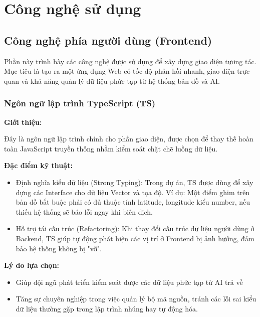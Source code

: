 \chapter{Công nghệ sử dụng}

\section{Công nghệ phía người dùng (Frontend)}

Phần này trình bày các công nghệ được sử dụng để xây dựng giao diện tương tác. Mục tiêu là tạo ra một ứng dụng Web có tốc độ phản hồi nhanh, giao diện trực quan và khả năng quản lý dữ liệu phức tạp từ hệ thống bản đồ và AI.

\subsection{Ngôn ngữ lập trình TypeScript (TS)}

\textbf{Giới thiệu:} 

Đây là ngôn ngữ lập trình chính cho phần giao diện, được chọn để thay thế hoàn toàn JavaScript truyền thống nhằm kiểm soát chặt chẽ luồng dữ liệu\cite{bierman2014understanding}.

\textbf{Đặc điểm kỹ thuật:}

\begin{itemize}
    \item Định nghĩa kiểu dữ liệu (Strong Typing): Trong dự án, TS được dùng để xây dựng các Interface cho dữ liệu Vector và tọa độ. Ví dụ: Một điểm ghim trên bản đồ bắt buộc phải có đủ thuộc tính latitude, longitude kiểu number, nếu thiếu hệ thống sẽ báo lỗi ngay khi biên dịch.

    \item Hỗ trợ tái cấu trúc (Refactoring): Khi thay đổi cấu trúc dữ liệu người dùng ở Backend, TS giúp tự động phát hiện các vị trí ở Frontend bị ảnh hưởng, đảm bảo hệ thống không bị "vỡ".
\end{itemize}

\textbf{Lý do lựa chọn:}

\begin{itemize}
    \item Giúp đội ngũ phát triển kiểm soát được các dữ liệu phức tạp từ AI trả về
    
    \item Tăng sự chuyên nghiệp trong việc quản lý bộ mã nguồn, tránh các lỗi sai kiểu dữ liệu thường gặp trong lập trình nhúng hay tự động hóa.
\end{itemize}


